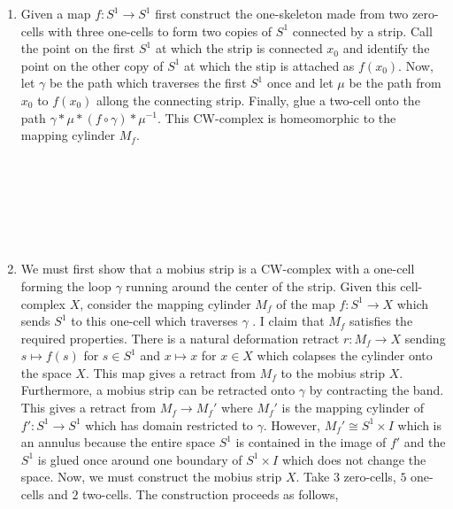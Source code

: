 \documentclass[12pt]{extarticle}
\begin{document}
\begin{enumerate}
\item Given a map $f : S^1 \to S^1$ first construct the one-skeleton made from two zero-cells with three one-cells to form two copies of $S^1$ connected by a strip. Call the point on the first $S^1$ at which the strip is connected $x_0$ and identify the point on the other copy of $S^1$ at which the stip is attached as $f(x_0)$. Now, let $\gamma$ be the path which traverses the first $S^1$ once and let $\mu$ be the path from $x_0$ to $f(x_0)$ allong the connecting strip. Finally, glue a two-cell onto the path $\gamma * \mu * (f \circ \gamma) * \mu^{-1}$. This CW-complex is homeomorphic to the mapping cylinder $M_f$.
\bigskip \\
\bigskip \\
\bigskip \\
\bigskip \\ 
\bigskip \\ 
\bigskip \\ 
\bigskip \\ 

\item We must first show that a mobius strip is a CW-complex with a one-cell forming the loop $\gamma$ running around the center of the strip. Given this cell-complex $X$, consider the mapping cylinder $M_f$ of the map $f : S^1 \to X$ which sends $S^1$ to this one-cell which traverses $\gamma$ . I claim that $M_f$ satisfies the required properties. There is a natural deformation retract $r : M_f \to X$ sending $s \mapsto f(s)$ for $s \in S^1$ and $x \mapsto x$ for $x \in X$ which colapses the cylinder onto the space $X$. This map gives a retract from $M_f$ to the mobius strip $X$. Furthermore, a mobius strip can be retracted onto $\gamma$ by contracting the band. This gives a retract from $M_f \to M_{f}'$ where $M_f'$ is the mapping cylinder of $f' : S^1 \to S^1$ which has domain restricted to $\gamma$. However, $M_f' \cong S^1 \times I$ which is an annulus because the entire space $S^1$ is contained in the image of $f'$ and the $S^1$ is glued once around one boundary of $S^1 \times I$ which does not change the space. Now, we must construct the mobius strip $X$. Take $3$ zero-cells, $5$ one-cells and $2$ two-cells. The construction proceeds as follows,   
\bigskip \\
\bigskip \\
\bigskip \\
\bigskip \\ 
\bigskip \\ 
\bigskip \\ 
\bigskip \\ 
\end{enumerate}
\end{document}
